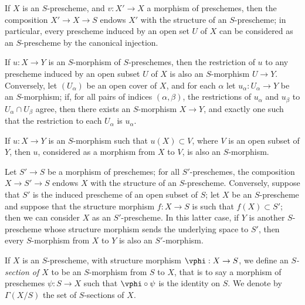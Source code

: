 \begin{env}[2.5.3]
\label{I.2.5.3}
If $X$ is an $S$-prescheme, and $v:X'\to X$ a morphism of preschemes, then the composition $X'\to X\to S$ endows $X'$ with the structure of an $S$-prescheme;
in particular, every prescheme induced by an open set $U$ of $X$ can be considered as an $S$-prescheme by the canonical injection.

If $u:X\to Y$ is an $S$-morphism of $S$-preschemes, then the restriction of $u$ to any prescheme induced by an open subset $U$ of $X$ is also an $S$-morphism $U\to Y$.
Conversely, let $(U_\alpha)$ be an open cover of $X$, and for each $\alpha$ let $u_\alpha:U_\alpha\to Y$ be an $S$-morphism;
if, for all pairs of indices $(\alpha,\beta)$, the restrictions of $u_\alpha$ and $u_\beta$ to $U_\alpha\cap U_\beta$ agree, then there exists an $S$-morphism $X\to Y$, and exactly one such that the restriction to each $U_\alpha$ is $u_\alpha$.

If $u:X\to Y$ is an $S$-morphism such that $u(X)\subset V$, where $V$ is an open subset of $Y$, then $u$, considered as a morphism from $X$ to $V$, is also an $S$-morphism.
\end{env}

\begin{env}[2.5.4]
\label{I.2.5.4}
Let $S'\to S$ be a morphism of preschemes;
for all $S'$-preschemes, the composition $X\to S'\to S$ endows $X$ with the structure of an $S$-prescheme.
Conversely, suppose that $S'$ is the induced prescheme of an open subset of $S$;
let $X$ be an $S$-prescheme and suppose that the structure morphism $f:X\to S$ is such that $f(X)\subset S'$;
then we can consider $X$ as an $S'$-prescheme.
In this latter case, if $Y$ is another $S$-prescheme whose structure morphism sends the underlying space to $S'$, then every $S$-morphism from $X$ to $Y$ is also an $S'$-morphism.
\end{env}

\begin{env}[2.5.5]
\label{I.2.5.5}
If $X$ is an $S$-prescheme, with structure morphism $\vphi:X\to S$, we define an \emph{$S$-section of $X$} to be an $S$-morphism from $S$ to $X$, that is to say a morphism of preschemes $\psi:S\to X$ such that $\vphi\circ\psi$ is the identity on $S$.
We denote by $\Gamma(X/S)$ the set of $S$-sections of $X$.
\end{env}
